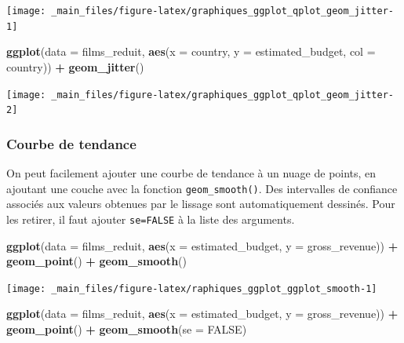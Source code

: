 \documentclass[
  11pt,
]{book}
\newenvironment{Shaded}{\begin{snugshade}}{\end{snugshade}}
\newcommand{\DataTypeTok}[1]{\textcolor[rgb]{0.13,0.29,0.53}{#1}}
\newcommand{\KeywordTok}[1]{\textcolor[rgb]{0.13,0.29,0.53}{\textbf{#1}}}
\newcommand{\NormalTok}[1]{#1}
\newcommand{\OperatorTok}[1]{\textcolor[rgb]{0.81,0.36,0.00}{\textbf{#1}}}
\newcommand{\OtherTok}[1]{\textcolor[rgb]{0.56,0.35,0.01}{#1}}
\newcommand{\StringTok}[1]{\textcolor[rgb]{0.31,0.60,0.02}{#1}}
\numberwithin{equation}{section}
\numberwithin{countremarque}{section}
\begin{document}
\begin{center}\texttt{[image: \_main\_files/figure-latex/graphiques\_ggplot\_qplot\_geom\_jitter-1]} \end{center}

\begin{Shaded}
\begin{Highlighting}[]
\KeywordTok{ggplot}\NormalTok{(}\DataTypeTok{data =}\NormalTok{ films\_reduit,}
       \KeywordTok{aes}\NormalTok{(}\DataTypeTok{x =}\NormalTok{ country, }\DataTypeTok{y =}\NormalTok{ estimated\_budget, }\DataTypeTok{col =}\NormalTok{ country)) }\OperatorTok{+}
\StringTok{  }\KeywordTok{geom\_jitter}\NormalTok{()}
\end{Highlighting}
\end{Shaded}

\begin{center}\texttt{[image: \_main\_files/figure-latex/graphiques\_ggplot\_qplot\_geom\_jitter-2]} \end{center}

\hypertarget{graphiques_ggplot_geom_smooth}{%
\subsubsection{Courbe de tendance}\label{graphiques_ggplot_geom_smooth}}

On peut facilement ajouter une courbe de tendance à un nuage de points, en ajoutant une couche avec la fonction \texttt{geom\_smooth()}. Des intervalles de confiance associés aux valeurs obtenues par le lissage sont automatiquement dessinés. Pour les retirer, il faut ajouter \texttt{se=FALSE} à la liste des arguments.

\begin{Shaded}
\begin{Highlighting}[]
\KeywordTok{ggplot}\NormalTok{(}\DataTypeTok{data =}\NormalTok{ films\_reduit,}
       \KeywordTok{aes}\NormalTok{(}\DataTypeTok{x =}\NormalTok{ estimated\_budget, }\DataTypeTok{y =}\NormalTok{ gross\_revenue)) }\OperatorTok{+}
\StringTok{  }\KeywordTok{geom\_point}\NormalTok{() }\OperatorTok{+}
\StringTok{  }\KeywordTok{geom\_smooth}\NormalTok{()}
\end{Highlighting}
\end{Shaded}

\begin{center}\texttt{[image: \_main\_files/figure-latex/raphiques\_ggplot\_ggplot\_smooth-1]} \end{center}

\begin{Shaded}
\begin{Highlighting}[]
\KeywordTok{ggplot}\NormalTok{(}\DataTypeTok{data =}\NormalTok{ films\_reduit,}
       \KeywordTok{aes}\NormalTok{(}\DataTypeTok{x =}\NormalTok{ estimated\_budget, }\DataTypeTok{y =}\NormalTok{ gross\_revenue)) }\OperatorTok{+}
\StringTok{  }\KeywordTok{geom\_point}\NormalTok{() }\OperatorTok{+}
\StringTok{  }\KeywordTok{geom\_smooth}\NormalTok{(}\DataTypeTok{se =} \OtherTok{FALSE}\NormalTok{)}
\end{Highlighting}
\end{Shaded}
\end{document}
